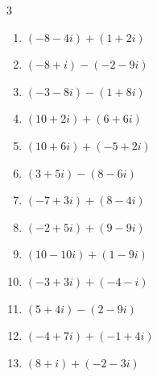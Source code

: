 \begin{multicols}{3}
\begin{enumerate}
        \phantom{$\displaystyle =-13+i$}

  \item $\displaystyle (-8-4i) + (1+2i)$

        \phantom{$\displaystyle =-7-2i$}

  \item $\displaystyle (-8+i) - (-2-9i)$

        \phantom{$\displaystyle =-6+10i$}

  \item $\displaystyle (-3-8i) - (1+8i)$

        \phantom{$\displaystyle =-4-16i$}

  \item $\displaystyle (10+2i) + (6+6i)$

        \phantom{$\displaystyle =16+8i$}

  \item $\displaystyle (10+6i) + (-5+2i)$

        \phantom{$\displaystyle =5+8i$}

  \item $\displaystyle (3+5i) - (8-6i)$

        \phantom{$\displaystyle =-5+11i$}

  \item $\displaystyle (-7+3i) + (8-4i)$

        \phantom{$\displaystyle =1-i$}

  \item $\displaystyle (-2+5i) + (9-9i)$

        \phantom{$\displaystyle =7-4i$}

  \item $\displaystyle (10-10i) + (1-9i)$

        \phantom{$\displaystyle =11-19i$}

  \item $\displaystyle (-3+3i) + (-4-i)$

        \phantom{$\displaystyle =-7+2i$}

  \item $\displaystyle (5+4i) - (2-9i)$

        \phantom{$\displaystyle =3+13i$}

  \item $\displaystyle (-4+7i) + (-1+4i)$

        \phantom{$\displaystyle =-5+11i$}

  \item $\displaystyle (8+i) + (-2-3i)$


\end{enumerate}
\end{multicols}
